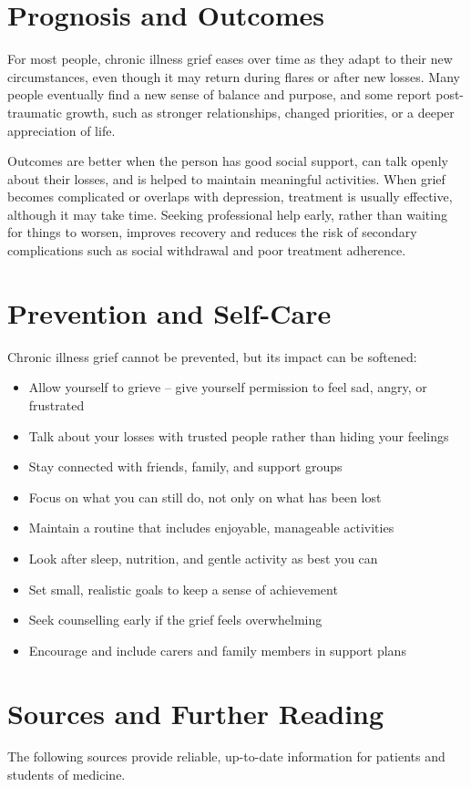 \section*{Prognosis and Outcomes}
For most people, chronic illness grief eases over time as they adapt to their new circumstances, even though it may return during flares or after new losses. Many people eventually find a new sense of balance and purpose, and some report post-traumatic growth, such as stronger relationships, changed priorities, or a deeper appreciation of life.

Outcomes are better when the person has good social support, can talk openly about their losses, and is helped to maintain meaningful activities. When grief becomes complicated or overlaps with depression, treatment is usually effective, although it may take time. Seeking professional help early, rather than waiting for things to worsen, improves recovery and reduces the risk of secondary complications such as social withdrawal and poor treatment adherence.

\section*{Prevention and Self-Care}
Chronic illness grief cannot be prevented, but its impact can be softened:

\begin{itemize}
    \item Allow yourself to grieve -- give yourself permission to feel sad, angry, or frustrated
    \item Talk about your losses with trusted people rather than hiding your feelings
    \item Stay connected with friends, family, and support groups
    \item Focus on what you can still do, not only on what has been lost
    \item Maintain a routine that includes enjoyable, manageable activities
    \item Look after sleep, nutrition, and gentle activity as best you can
    \item Set small, realistic goals to keep a sense of achievement
    \item Seek counselling early if the grief feels overwhelming
    \item Encourage and include carers and family members in support plans
\end{itemize}

\section*{Sources and Further Reading}
The following sources provide reliable, up-to-date information for patients and students of medicine.

